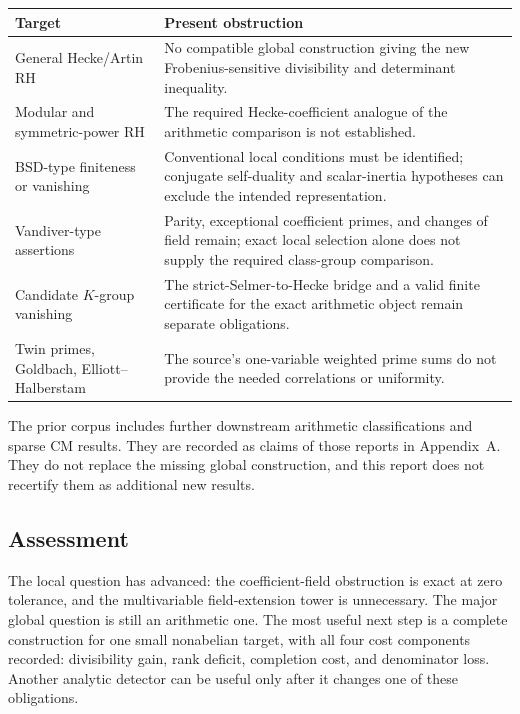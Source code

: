 \begin{center}
\begin{tabular}{@{}>{\raggedright\arraybackslash}p{.25\linewidth}>{\raggedright\arraybackslash}p{.66\linewidth}@{}}
\toprule
Target & Present obstruction\\
\midrule
General Hecke/Artin RH & No compatible global construction giving the new Frobenius-sensitive divisibility and determinant inequality.\\
Modular and symmetric-power RH & The required Hecke-coefficient analogue of the arithmetic comparison is not established.\\
BSD-type finiteness or vanishing & Conventional local conditions must be identified; conjugate self-duality and scalar-inertia hypotheses can exclude the intended representation.\\
Vandiver-type assertions & Parity, exceptional coefficient primes, and changes of field remain; exact local selection alone does not supply the required class-group comparison.\\
Candidate $K$-group vanishing & The strict-Selmer-to-Hecke bridge and a valid finite certificate for the exact arithmetic object remain separate obligations.\\
Twin primes, Goldbach, Elliott--Halberstam & The source's one-variable weighted prime sums do not provide the needed correlations or uniformity.\\
\bottomrule
\end{tabular}
\end{center}

The prior corpus includes further downstream arithmetic classifications and sparse CM results. They are recorded as claims of those reports in Appendix~A. They do not replace the missing global construction, and this report does not recertify them as additional new results.

\subsection{Assessment}
The local question has advanced: the coefficient-field obstruction is exact at zero tolerance, and the multivariable field-extension tower is unnecessary. The major global question is still an arithmetic one. The most useful next step is a complete construction for one small nonabelian target, with all four cost components recorded: divisibility gain, rank deficit, completion cost, and denominator loss. Another analytic detector can be useful only after it changes one of these obligations.

